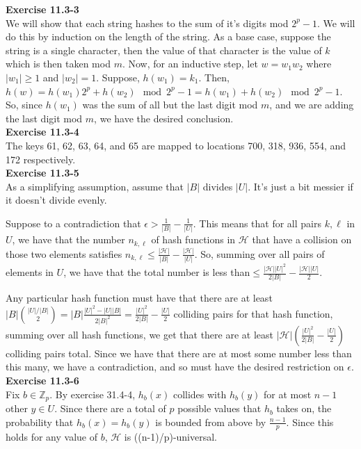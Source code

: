 \documentclass{article}
\begin{document}
\noindent\textbf{ Exercise 11.3-3} \\

We will show that each string hashes to the sum of it's digits mod $2^p-1$. We will do this by induction on the length of the string. As a base case, suppose the string is a single character, then the value of that character is the value of $k$ which is then taken mod $m$. Now, for an inductive step, let $w = w_1 w_2$ where $|w_1|\ge 1$ and $|w_2|=1$. Suppose, $h(w_1) = k_1$. Then, $h(w) = h(w_1)2^p + h(w_2) \mod 2^p-1 = h(w_1)+h(w_2) \mod 2^p-1$. So, since $h(w_1)$ was the sum of all but the last digit mod $m$, and we are adding the last digit mod $m$, we have the desired conclusion.\\

\noindent\textbf{Exercise 11.3-4}\\

The keys 61, 62, 63, 64, and 65 are mapped to locations 700, 318, 936, 554, and 172 respectively. \\

\noindent\textbf{ Exercise 11.3-5} \\

As a simplifying assumption, assume that $|B|$ divides $|U|$. It's just a bit messier if it doesn't divide evenly.

Suppose to a contradiction that $\epsilon > \frac{1}{|B|} - \frac{1}{|U|}$. This means that for all pairs $k,\ell$ in $U$, we have that the number $n_{k,\ell}$ of hash functions in $\mathcal{H}$ that have a collision on those two elements satisfies $n_{k,\ell} \le \frac{|\mathcal{H}|}{|B|} - \frac{|\mathcal{H}|}{|U|}$. So, summing over all pairs of elements in $U$, we have that the total number is less than$\le \frac{|\mathcal{H}||U|^2}{2|B|} - \frac{|\mathcal{H}||U|}{2}$.

Any particular hash function must have that there are at least $|B| \binom{|U|/|B|}{2} = |B|\frac{|U|^2 - |U||B|}{2|B|^2} = \frac{|U|^2}{2|B|} - \frac{|U|}{2}$ colliding pairs for that hash function, summing over all hash functions, we get that there are at least $|\mathcal{H}| \left( \frac{|U|^2}{2|B|} - \frac{|U|}{2}\right)$ colliding pairs total. Since we have that there are at most some number less than this many, we have a contradiction, and so must have the desired restriction on $\epsilon$.\\


\noindent\textbf{Exercise 11.3-6}\\

Fix $b \in \mathbb{Z}_p$.  By exercise 31.4-4, $h_b(x)$ collides with $h_b(y)$ for at most $n-1$ other $y \in U$.  Since there are a total of $p$ possible values that $h_b$ takes on, the probability that $h_b(x) = h_b(y)$ is bounded from above by $\frac{n-1}{p}$.  Since this holds for any value of $b$, $\mathcal{H}$ is ((n-1)/p)-universal. \\
\end{document}
